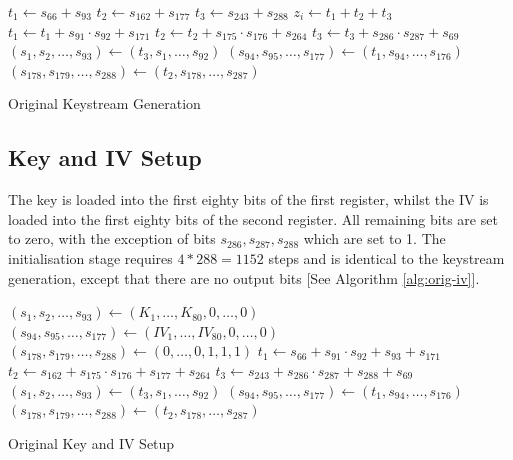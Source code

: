 \documentclass[conference]{IEEEtran}
\begin{document}
\begin{algorithm}[H]
\begin{algorithmic}[1]
 
\State $t_1 \gets s_{66} + s_{93}$
\State $t_2 \gets s_{162} + s_{177}$
\State $t_3 \gets s_{243} + s_{288}$
\State
\State $z_i \gets t_1 + t_2 + t_3$
\State
\State $t_1 \gets t_1 + s_{91} \cdot s_{92} + s_{171}$
\State $t_2 \gets t_2 + s_{175} \cdot s_{176} + s_{264}$
\State $t_3 \gets t_3 + s_{286} \cdot s_{287} + s_{69}$
\State
\State $(s_1,s_2,\dots,s_{93}) \gets (t_3,s_1,\dots,s_{92})$
\State $(s_{94},s_{95},\dots,s_{177}) \gets (t_1,s_{94},\dots,s_{176})$
\State $(s_{178},s_{179},\dots,s_{288}) \gets (t_2,s_{178},\dots,s_{287})$
\EndFor
\end{algorithmic}
\caption{Original Keystream Generation}\label{alg:orig}
\end{algorithm}

\subsection{Key and IV Setup}\label{sec:key-iv-o}
The key is loaded into the first eighty bits of the first register, whilst the IV is loaded into the first eighty bits of the second register. All remaining bits are set to zero, with the exception of bits $s_{286},s_{287},s_{288}$ which are set to 1. The initialisation stage requires $4*288=1152$ steps and is identical to the keystream generation, except that there are no output bits [See Algorithm \ref{alg:orig-iv}].

\begin{algorithm}[H]
\begin{algorithmic}[1]
\State $(s_1,s_2,\dots,s_{93}) \gets (K_1,\dots,K_{80},0,\dots,0)$
\State $(s_{94},s_{95},\dots,s_{177}) \gets (IV_1,\dots,IV_{80},0,\dots,0)$
\State $(s_{178},s_{179},\dots,s_{288}) \gets (0,\dots,0,1,1,1)$
\State
{}
\State $t_1 \gets s_{66} + s_{91} \cdot s_{92} + s_{93} + s_{171}$
\State $t_2 \gets s_{162} + s_{175} \cdot s_{176} + s_{177} + s_{264}$
\State $t_3 \gets s_{243} + s_{286} \cdot s_{287} + s_{288}+ s_{69}$
\State
\State $(s_1,s_2,\dots,s_{93}) \gets (t_3,s_1,\dots,s_{92})$
\State $(s_{94},s_{95},\dots,s_{177}) \gets (t_1,s_{94},\dots,s_{176})$
\State $(s_{178},s_{179},\dots,s_{288}) \gets (t_2,s_{178},\dots,s_{287})$
\EndFor
\end{algorithmic}
\caption{Original Key and IV Setup}\label{alg:orig-iv}
\end{algorithm}
\end{document}

